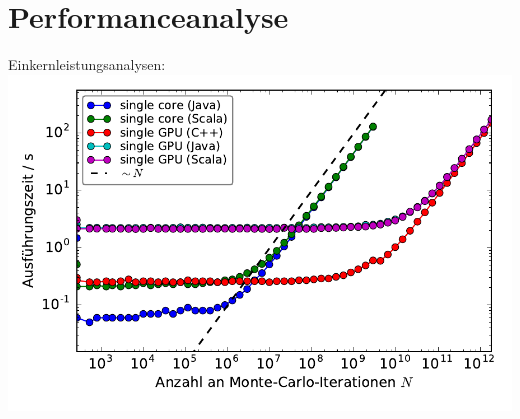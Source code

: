 \section{Performanceanalyse}


\begin{frame}
    Einkernleistungsanalysen:
    \includegraphics[width=0.8\linewidth]{benchmarks-workload-scaling.pdf}
\end{frame}

